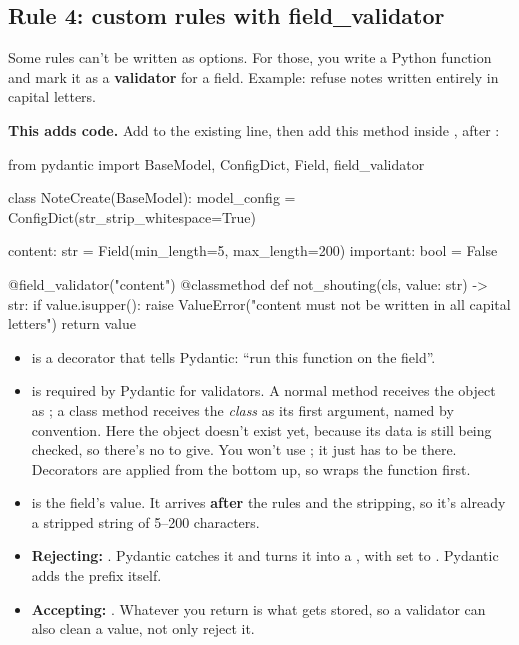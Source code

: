 \subsection{Rule 4: custom rules with field\_validator}

Some rules can't be written as  options. For those, you write a Python function and mark it as a \textbf{validator} for a field. Example: refuse notes written entirely in capital letters.

\textbf{This adds code.} Add  to the existing  line, then add this method inside , after :

\begin{py}
from pydantic import BaseModel, ConfigDict, Field, field_validator


class NoteCreate(BaseModel):
	model_config = ConfigDict(str_strip_whitespace=True)

	content: str = Field(min_length=5, max_length=200)
	important: bool = False

	@field_validator("content")
	@classmethod
	def not_shouting(cls, value: str) -> str:
		if value.isupper():
			raise ValueError("content must not be written in all capital letters")
		return value
\end{py}

\begin{itemize}
\item {} is a decorator that tells Pydantic: ``run this function on the  field''.
\item {} is required by Pydantic for validators. A normal method receives the object as ; a class method receives the \emph{class} as its first argument, named  by convention. Here the object doesn't exist yet, because its data is still being checked, so there's no  to give. You won't use ; it just has to be there. Decorators are applied from the bottom up, so  wraps the function first.
\item {} is the field's value. It arrives \textbf{after} the  rules and the stripping, so it's already a stripped string of 5--200 characters.
\item \textbf{Rejecting:} . Pydantic catches it and turns it into a , with  set to . Pydantic adds the  prefix itself.
\item \textbf{Accepting:} . Whatever you return is what gets stored, so a validator can also clean a value, not only reject it.
\end{itemize}

